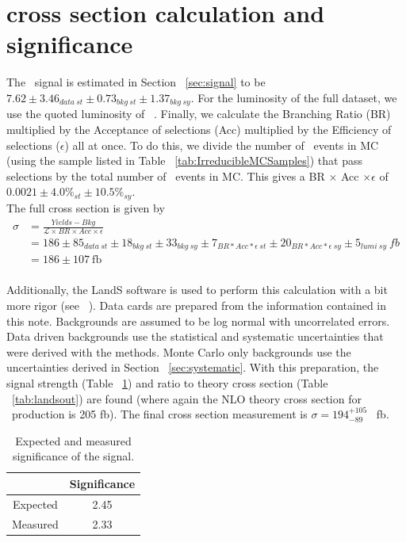 	\section{cross section calculation and significance}
	The \ttZ \ signal is estimated in Section ~\ref{sec:signal} to be $7.62 \pm 3.46_{data\ st} \pm 0.73_{bkg\ st} \pm 1.37_{bkg\ sy}$. For the luminosity of the full dataset, we use the quoted luminosity of \intLumiwError ~\cite{lumimeasurement}. Finally, we calculate the Branching Ratio (BR) multiplied by the Acceptance of selections (Acc) multiplied by the Efficiency of selections ($\epsilon$) all at once. To do this, we divide the number of \ttZ \ events in MC (using the sample listed in Table ~\ref{tab:IrreducibleMCSamples}) that pass selections by the total number of \ttZ \ events in MC. This gives a BR $\times$ Acc $\times \epsilon$ of $0.0021 \pm 4.0\% _{st} \pm 10.5\% _{sy}$.\\

The full cross section is given by 
          \begin{align*}
         \sigma &= \frac{Yields - Bkg}{\mathcal{L} \times BR \times Acc \times \epsilon} \\
                      &=  186 \pm 85_{data\ st} \pm 18_{bkg\ st} \pm 33_{bkg\ sy} \pm 7_{BR*Acc*\epsilon\ st} \pm 20_{BR*Acc*\epsilon\ sy} \pm 5_{lumi\ sy}\ fb\\
                      &= 186 \pm 107\ \text{fb}\\
          \end{align*}
          
          
          
 Additionally, the LandS software is used to perform this calculation with a bit more rigor (see ~\cite{higgscomb}). Data cards are prepared from the information contained in this note. Backgrounds are assumed to be log normal with uncorrelated errors. Data driven backgrounds use the statistical and systematic uncertainties that were derived with the methods. Monte Carlo only backgrounds use the uncertainties derived in Section ~\ref{sec:systematic}. With this preparation, the signal strength (Table ~\ref{tab:significance}) and ratio to theory cross section (Table ~\ref{tab:landsout}) are found (where again the NLO theory cross section for \ttZ \ production is 205 fb). The final cross section measurement is $\sigma=194 _{-89} ^{+105}$ \ fb.
 
 
 
\begin{table}[ht!]
\begin{center}
\caption{\small \label{tab:significance} Expected and measured significance of the signal.}
\begin{tabular}{c|c}\hline
	& Significance	 \\ \hline
Expected	& 2.45	 \\
Measured	& 2.33	 \\
\hline
\end{tabular}
\end{center}
\end{table}
 
